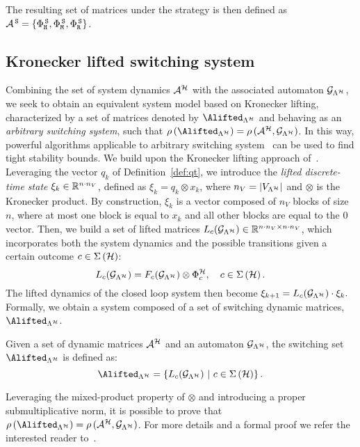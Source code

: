 %
The resulting set of matrices under the \tS{} strategy is then defined as $\mathcal{A}^{\,\texttt{S}}=\left\{\Phi{}^{\,\texttt{S}}_{\texttt{H}},\Phi{}^{\,\texttt{S}}_{\texttt{M}},\Phi{}^{\,\texttt{S}}_{\texttt{R}}\right\}$.


\subsection{Kronecker lifted switching system}%
\label{sec:system_dynamics}

Combining the set of system dynamics $\mathcal{A}^{\mathcal{H}}$ with the associated automaton $\mathcal{G}_{\Lambda^{\mathcal{H}}}$, we seek to obtain an equivalent system model based on Kronecker lifting, characterized by a set of matrices denoted by $\Alifted_{\Lambda^\strat}$ and behaving as an \emph{arbitrary switching system}, such that $\rho\,(\Alifted_{\Lambda^\strat})= \rho\,(\Aa^{\strat},\GG{\Lambda^\strat})$.
In this way, powerful algorithms applicable to arbitrary switching system~\cite{vankeerberghen2014jsr,sparsejsr} can be used to find tight stability bounds.
%
We build upon the Kronecker lifting approach of~\cite{xu2020approximation}.
Leveraging the vector $q_k$ of Definition~\ref{def:qt}, we introduce the \emph{lifted discrete-time state} $\xi_k \in \mathbb{R}^{n\cdot n_V}$, defined as $\xi_k = q_k\otimes x_k$, where $n_V = \left|V_{\Lambda^{\mathcal{H}}}\right|$ and $\otimes$ is the Kronecker product.
By construction, $\xi_k$ is a vector composed of $n_V$ blocks of size $n$, where at most one block is equal to $x_k$ and all other blocks are equal to the $0$ vector.
%
Then, we build a set of lifted matrices $L_{c} ( \mathcal{G}_{\Lambda^{\mathcal{H}}} ) \in \mathbb{R}^{n\cdot n_V\times n\cdot n_V}$, which incorporates both the system dynamics and the possible transitions given a certain outcome $c\in\Sigma\left(\mathcal{H}\right)$:
%
\begin{equation}\label{eq:lifted_matrix}
    L_{c} ( \GG{\Lambda^\strat} ) = F_{c} ( \GG{\Lambda^\strat} )\otimes \clmat^\strat_c, \quad c \in \Sigma \left( \strat \right).
\end{equation}
%
The lifted dynamics of the closed loop system then become $ \xi_{k+1} = L_{c} ( \mathcal{G}_{\Lambda^{\mathcal{H}}} )\cdot\xi_k.  $
Formally, we obtain a system composed of a set of switching dynamic matrices, $\Alifted_{\Lambda^\strat}$.
%
\begin{definition}%
    \label{def:switching_set}%
    Given a set of dynamic matrices $\mathcal{A}^{\mathcal{H}}$ and an automaton $\mathcal{G}_{\Lambda^{\mathcal{H}}}$, the switching set $\Alifted_{\Lambda^\strat}$ is defined as:
    $$
        \Alifted_{\Lambda^\strat} = \left\{ L_{c} ( \GG{\Lambda^\strat} ) \,\, | \,\, c \in \Sigma\left(\strat\right) \right\}.
    $$
\end{definition}%
%
Leveraging the mixed-product property of $\otimes$ and introducing a proper submultiplicative norm, it is possible to prove that $\rho\left(\Alifted_{\Lambda^\strat}\right)= \rho\,(\Aa^{\strat},\GG{\Lambda^\strat})$.
For more details and a formal proof we refer the interested reader to~\cite{xu2020approximation}.

